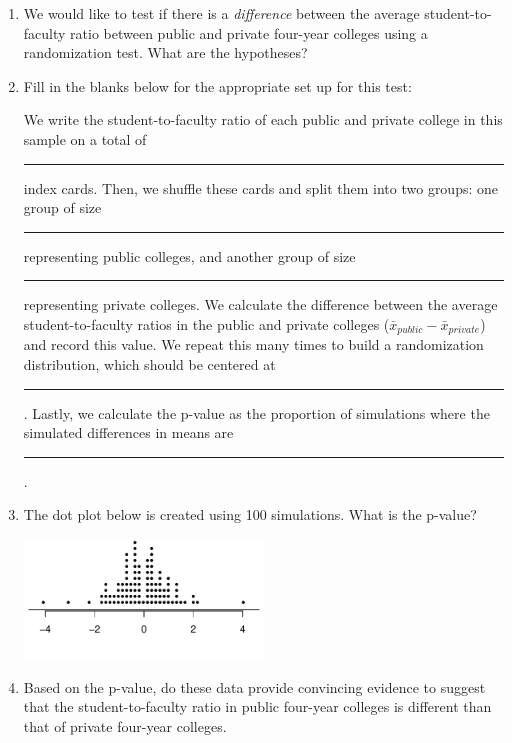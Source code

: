 \documentclass[12pt]{article}
\begin{document}
\begin{enumerate}

\item We would like to test if there is a \emph{difference} between the average student-to-faculty ratio between public and private four-year colleges using a randomization test. What are the hypotheses?

\item Fill in the blanks below for the appropriate set up for this test:

\begin{doublespace}
We write the student-to-faculty ratio of each public and private college in this sample on a total of \rule{2cm}{0.5pt} index cards. Then, we shuffle these cards and split them into two groups: one group of size \rule{2cm}{0.5pt} representing public colleges, and another group of size \rule{2cm}{0.5pt} representing private colleges. We calculate the difference between the average student-to-faculty ratios in the public and private colleges ($\bar{x}_{public} - \bar{x}_{private}$) and record this value. We repeat this many times to build a randomization distribution, which should be centered at \rule{2cm}{0.5pt} . Lastly, we calculate the p-value as the proportion of simulations where the simulated differences in means are \rule{2cm}{0.5pt}.
\end{doublespace}

\item The dot plot below is created using 100 simulations. What is the p-value?

\begin{center}
\includegraphics[width=0.5\textwidth]{ratio/rand_dist}
\end{center}

\item Based on the p-value, do these data provide convincing evidence to suggest that the student-to-faculty ratio in public four-year colleges is different than that of private four-year  colleges.

\end{enumerate}
\end{document}
